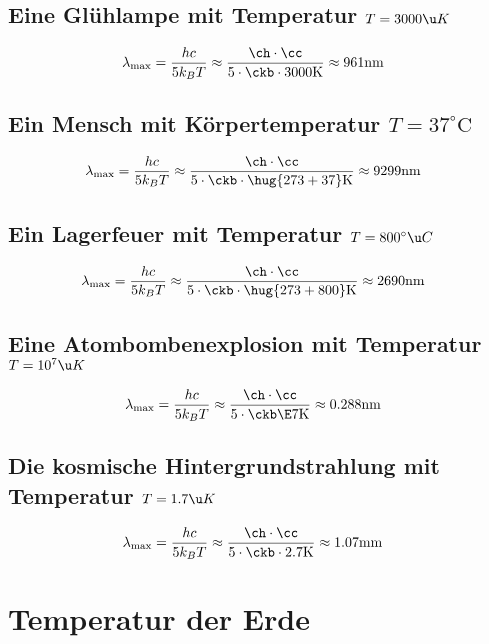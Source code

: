 \documentclass[ex]{exercise}
\begin{document}
\subsection{Eine Glühlampe mit Temperatur \(T=3000\u K\)}
\begin{align*}
    \lambda_{\max} &= \frac{h c}{5 k_B T} \approx \frac{\ch \cdot \cc}{5\cdot \ckb \cdot 3000\mathrm K}
    \approx 961 \mathrm{nm}
\end{align*}

\subsection{Ein Mensch mit Körpertemperatur \(T=37^\circ \mathrm C\)}
\begin{align*}
    \lambda_{\max} &= \frac{h c}{5 k_B T} \approx \frac{\ch \cdot \cc}{5\cdot \ckb \cdot \hug{273+37}\mathrm K}
    \approx 9299 \mathrm{nm}
\end{align*}

\subsection{Ein Lagerfeuer mit Temperatur \(T=800^\circ \u C\)}
\begin{align*} 
    \lambda_{\max} &= \frac{h c}{5 k_B T} \approx \frac{\ch \cdot \cc}{5\cdot \ckb \cdot \hug{273+800}\mathrm K}
    \approx 2690 \mathrm{nm}
\end{align*}

\subsection{Eine Atombombenexplosion mit Temperatur \(T=10^7\u K\)}
\begin{align*}
    \lambda_{\max} &= \frac{h c}{5 k_B T} \approx \frac{\ch \cdot \cc}{5\cdot \ckb \E7\mathrm K}
    \approx 0.288 \mathrm{nm}
\end{align*}

\subsection{Die kosmische Hintergrundstrahlung mit Temperatur \(T=1.7\u K\)}
\begin{align*}
    \lambda_{\max} &= \frac{h c}{5 k_B T} \approx \frac{\ch \cdot \cc}{5\cdot \ckb \cdot 2.7\mathrm K}
    \approx 1.07 \mathrm{mm}
\end{align*}

\section{Temperatur der Erde}
\end{document}
